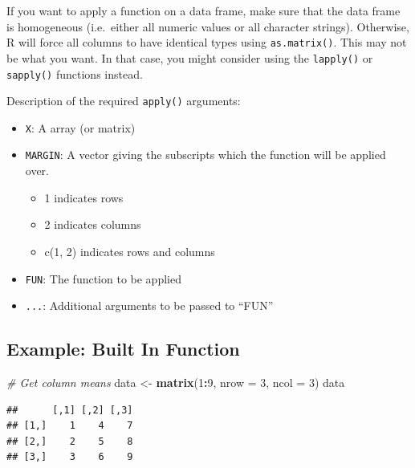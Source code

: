 \documentclass[
]{book}
\newenvironment{Shaded}{\begin{snugshade}}{\end{snugshade}}
\newcommand{\CommentTok}[1]{\textcolor[rgb]{0.56,0.35,0.01}{\textit{#1}}}
\newcommand{\DataTypeTok}[1]{\textcolor[rgb]{0.13,0.29,0.53}{#1}}
\newcommand{\DecValTok}[1]{\textcolor[rgb]{0.00,0.00,0.81}{#1}}
\newcommand{\KeywordTok}[1]{\textcolor[rgb]{0.13,0.29,0.53}{\textbf{#1}}}
\newcommand{\NormalTok}[1]{#1}
\newcommand{\OperatorTok}[1]{\textcolor[rgb]{0.81,0.36,0.00}{\textbf{#1}}}
\newcommand{\StringTok}[1]{\textcolor[rgb]{0.31,0.60,0.02}{#1}}
\providecommand{\tightlist}{%
  \setlength{\itemsep}{0pt}\setlength{\parskip}{0pt}}
\begin{document}
If you want to apply a function on a data frame, make sure that the data frame is homogeneous (i.e.~either all numeric values or all character strings). Otherwise, R will force all columns to have identical types using \texttt{as.matrix()}. This may not be what you want. In that case, you might consider using the \texttt{lapply()} or \texttt{sapply()} functions instead.

Description of the required \texttt{apply()} arguments:

\begin{itemize}
\tightlist
\item
  \texttt{X}: A array (or matrix)
\item
  \texttt{MARGIN}: A vector giving the subscripts which the function will be applied over.

  \begin{itemize}
  \tightlist
  \item
    1 indicates rows
  \item
    2 indicates columns
  \item
    c(1, 2) indicates rows and columns
  \end{itemize}
\item
  \texttt{FUN}: The function to be applied
\item
  \texttt{...}: Additional arguments to be passed to ``FUN''
\end{itemize}

\hypertarget{example-built-in-function}{%
\subsection*{Example: Built In Function}\label{example-built-in-function}}

\begin{Shaded}
\begin{Highlighting}[]
\CommentTok{# Get column means}
\NormalTok{data <-}\StringTok{ }\KeywordTok{matrix}\NormalTok{(}\DecValTok{1}\OperatorTok{:}\DecValTok{9}\NormalTok{, }\DataTypeTok{nrow =} \DecValTok{3}\NormalTok{,}
    \DataTypeTok{ncol =} \DecValTok{3}\NormalTok{)}
\NormalTok{data}
\end{Highlighting}
\end{Shaded}

\begin{verbatim}
##      [,1] [,2] [,3]
## [1,]    1    4    7
## [2,]    2    5    8
## [3,]    3    6    9
\end{verbatim}
\end{document}
